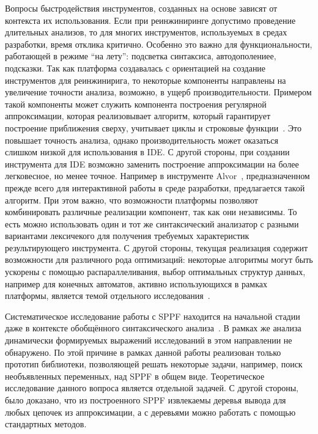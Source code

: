 Вопросы быстродействия инструментов, созданных на основе зависят от контекста их использования. Если при реинжиниринге допустимо проведение длительных анализов, то для многих инструментов, используемых  в средах разработки, время отклика критично.  Особенно это важно для функциональности, работающей в режиме ``на лету'': подсветка синтаксиса, автодополениее, подсказки. Так как платформа создавалась с ориентацией на создание инструментов для реинжинирига, то некоторые компоненты направлены на увеличение точности анализа, возможно, в ущерб производительности. Примером такой компоненты может служить компонента построения регулярной аппроксимации, которая реализовывает алгоритм, который гарантирует построение приближения сверху, учитывает циклы и строковые функции~\cite{RegOverApprox}. Это повышает точность анализа, однако производительность может оказаться слишком низкой для использования в IDE. С другой стороны, при создании инструмента для IDE возможно заменить построение аппроксимации на более легковесное, но менее точное. Например в инструменте Alvor~\cite{Alvor2}, предназначенном прежде всего для интерактивной работы в среде разработки, предлагается такой алгоритм.  При этом важно, что возможности платформы позволяют комбинировать различные реализации компонент, так как они независимы. То есть можно использовать один и тот же синтаксический анализатор с разными вариантами лексичекого для получения требуемых характеристик результирующего инструмента. С другой стороны, текущая реализация содержит возможности для различного рода оптимизаций: некоторые алгоритмы могут быть ускорены с помощью распараллеливания, выбор оптимальных структур данных, например для конечных автоматов, активно использующихся в рамках платформы, является темой отдельного исследования~\cite{DataStructureForFA}.

Систематическое исследование работы с SPPF находится на начальной стадии даже в контексте обобщённого синтаксического анализа~\cite{SPPF2015}. В рамках же анализа динамически формируемых выражений исследований в этом направлении не обнаружено. По этой причине в рамках данной работы реализован только прототип библиотеки, позволяющей решать некоторые задачи, например, поиск необъявленных переменных, над SPPF в общем виде. Теоретическое исследование данного вопроса является отдельной задачей. С другой стороны, было доказано, что из построенного SPPF извлекаемы деревья вывода для любых цепочек из аппроксимации, а с деревьями можно работать с помощью стандартных методов. 

\clearpage
